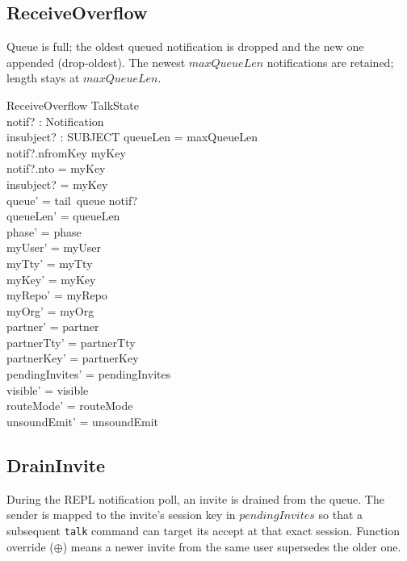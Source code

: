 \documentclass[a4paper,10pt,fleqn]{article}
\begin{document}
\subsection{ReceiveOverflow}

Queue is full; the oldest queued notification is dropped and the new
one appended (drop-oldest).  The newest $maxQueueLen$ notifications are
retained; length stays at $maxQueueLen$.

\begin{schema}{ReceiveOverflow}
  \Delta TalkState \\
  notif? : Notification \\
  insubject? : SUBJECT
\where
  queueLen = maxQueueLen \\
  notif?.nfromKey \neq myKey \\
  notif?.nto = myKey \\
  insubject? = myKey \\
  queue' = tail~queue \cat \langle notif? \rangle \\
  queueLen' = queueLen \\
  phase' = phase \\
  myUser' = myUser \\
  myTty' = myTty \\
  myKey' = myKey \\
  myRepo' = myRepo \\
  myOrg' = myOrg \\
  partner' = partner \\
  partnerTty' = partnerTty \\
  partnerKey' = partnerKey \\
  pendingInvites' = pendingInvites \\
  visible' = visible \\
  routeMode' = routeMode \\
  unsoundEmit' = unsoundEmit
\end{schema}

\subsection{DrainInvite}

During the REPL notification poll, an invite is drained from the
queue.  The sender is mapped to the invite's session key in
$pendingInvites$ so that a subsequent \texttt{talk} command can target
its accept at that exact session.  Function override ($\oplus$) means a
newer invite from the same user supersedes the older one.
\end{document}
